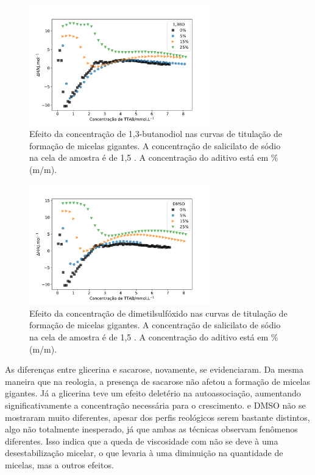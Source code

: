 						
			\begin{figure}[h]
				\centering
				\includegraphics[width=0.7\textwidth]{imagens/itc/ITC_MG_13BD}
				\caption{Efeito da concentração de 1,3-butanodiol nas curvas de titulação de formação de micelas gigantes. A concentração de salicilato de sódio na cela de amostra é de 1,5 \mM. A concentração do aditivo está em \% (m/m).}
				\label{fig:itc_mg_13bd}
			\end{figure} 
			
			\begin{figure}[h]
				\centering
				\includegraphics[width=0.7\textwidth]{imagens/itc/ITC_MG_dmso}
				\caption{Efeito da concentração de dimetilsulfóxido nas curvas de titulação de formação de micelas gigantes. A concentração de salicilato de sódio na cela de amostra é de 1,5 \mM. A concentração do aditivo está em \% (m/m).}
				\label{fig:itc_mg_dmso} 
			\end{figure}

			As diferenças entre glicerina e sacarose, novamente, se evidenciaram. Da mesma maneira que na reologia, a presença de sacarose não afetou a formação de micelas gigantes. Já a glicerina teve um efeito deletério na autoassociação, aumentando significativamente a concentração necessária para o crescimento. \BD{} e DMSO não se mostraram muito diferentes, apesar dos perfis reológicos serem bastante distintos, algo não totalmente inesperado, já que ambas as técnicas observam fenômenos diferentes. Isso indica que a queda de viscosidade com \BD{} não se deve à uma desestabilização micelar, o que levaria à uma diminuição na quantidade de micelas, mas a outros efeitos.

